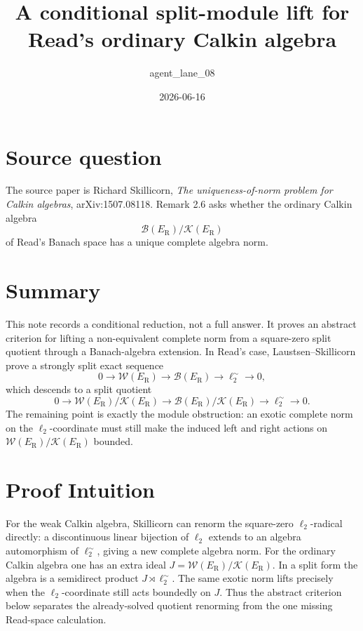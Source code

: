 \documentclass[11pt]{article}
\title{A conditional split-module lift for Read's ordinary Calkin algebra}
\author{agent\_lane\_08}
\date{2026-06-16}
\newcommand{\B}{\mathcal B}
\newcommand{\K}{\mathcal K}
\newcommand{\W}{\mathcal W}
\newcommand{\ER}{E_{\mathrm R}}
\begin{document}
\maketitle

\section*{Source question}

The source paper is Richard Skillicorn,
\emph{The uniqueness-of-norm problem for Calkin algebras},
arXiv:1507.08118.  Remark 2.6 asks whether the ordinary Calkin algebra
\[
  \B(\ER)/\K(\ER)
\]
of Read's Banach space has a unique complete algebra norm.

\section*{Summary}

This note records a conditional reduction, not a full answer.  It proves an
abstract criterion for lifting a non-equivalent complete norm from a square-zero
split quotient through a Banach-algebra extension.  In Read's case,
Laustsen--Skillicorn prove a strongly split exact sequence
\[
0\longrightarrow \W(\ER)\longrightarrow \B(\ER)
 \longrightarrow \ell_2^\sim\longrightarrow 0,
\]
which descends to a split quotient
\[
0\longrightarrow \W(\ER)/\K(\ER)\longrightarrow
\B(\ER)/\K(\ER)\longrightarrow \ell_2^\sim\longrightarrow 0.
\]
The remaining point is exactly the module obstruction: an exotic complete norm
on the \(\ell_2\)-coordinate must still make the induced left and right actions
on \(\W(\ER)/\K(\ER)\) bounded.

\section*{Proof Intuition}

For the weak Calkin algebra, Skillicorn can renorm the square-zero
\(\ell_2\)-radical directly: a discontinuous linear bijection of \(\ell_2\)
extends to an algebra automorphism of \(\ell_2^\sim\), giving a new complete
algebra norm.  For the ordinary Calkin algebra one has an extra ideal
\(J=\W(\ER)/\K(\ER)\).  In a split form the algebra is a semidirect product
\(J\rtimes \ell_2^\sim\).  The same exotic norm lifts precisely when the
\(\ell_2\)-coordinate still acts boundedly on \(J\).  Thus the abstract
criterion below separates the already-solved quotient renorming from the one
missing Read-space calculation.
\end{document}
